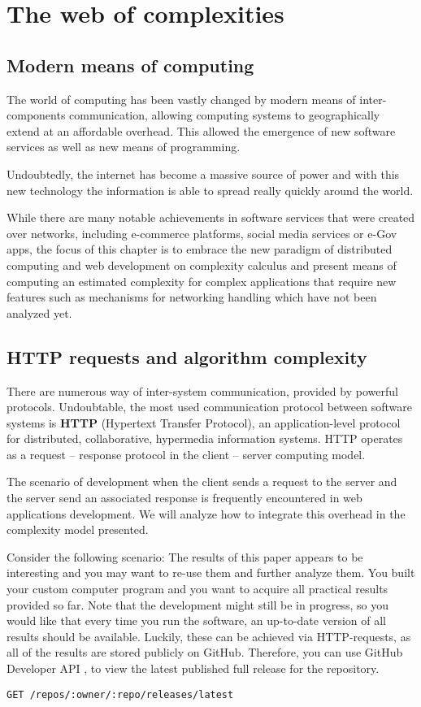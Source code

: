 \chapter{The web of complexities}

\section{Modern means of computing}
The world of computing has been vastly changed by modern means of inter-components communication, allowing computing systems to geographically extend at an affordable overhead. This allowed the emergence of new software services as well as new means of programming. 

Undoubtedly, the internet has become a massive source of power and with this new technology the information is able to spread really quickly around the world.

While there are many notable achievements in software services that were created over networks, including e-commerce platforms, social media services or e-Gov apps, the focus of this chapter is to embrace the new paradigm of distributed computing and web development on complexity calculus and present means of computing an estimated complexity for complex applications that require new features such as mechanisms for networking handling which have not been analyzed yet.

\section{HTTP requests and algorithm complexity}

There are numerous way of inter-system communication, provided by powerful protocols. Undoubtable, the most used communication protocol between software systems is \textbf{HTTP} (Hypertext Transfer Protocol), an application-level protocol for distributed, collaborative, hypermedia information systems. HTTP operates as a request – response protocol in the client – server computing model.

The scenario of development when the client sends a request to the server and the server send an associated response is frequently encountered in web applications development. We will analyze how to integrate this overhead in the complexity model presented.

Consider the following scenario: The results of this paper appears to be interesting and you may want to re-use them and further analyze them. You built your custom computer program and you want to acquire all practical results provided so far. Note that the development might still be in progress, so you would like that every time you run the software, an up-to-date version of all results should be available. Luckily, these can be achieved via HTTP-requests, as all of the results are stored publicly on GitHub. Therefore, you can use GitHub Developer API , to view the latest published full release for the repository.

\begin{verbatim}
GET /repos/:owner/:repo/releases/latest
\end{verbatim}